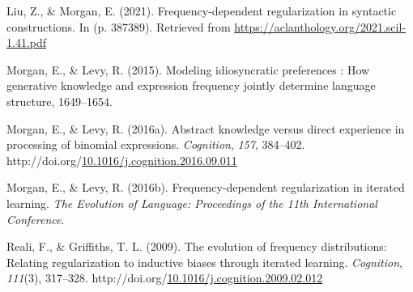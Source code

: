 \documentclass[10pt, letterpaper]{article}
\newenvironment{CSLReferences}%
  {}%
  {\par}
\begin{document}
\begin{CSLReferences}{1}{0}
\leavevmode{}%
Liu, Z., \& Morgan, E. (2021). Frequency-dependent regularization in
syntactic constructions. In (p. 387389). Retrieved from
\url{https://aclanthology.org/2021.scil-1.41.pdf}

\leavevmode{}%
Morgan, E., \& Levy, R. (2015). Modeling idiosyncratic preferences : How
generative knowledge and expression frequency jointly determine language
structure, 1649--1654.

\leavevmode{}%
Morgan, E., \& Levy, R. (2016a). Abstract knowledge versus direct
experience in processing of binomial expressions. \emph{Cognition},
\emph{157}, 384--402.
http://doi.org/\href{https://doi.org/10.1016/j.cognition.2016.09.011}{10.1016/j.cognition.2016.09.011}

\leavevmode{}%
Morgan, E., \& Levy, R. (2016b). Frequency-dependent regularization in
iterated learning. \emph{The Evolution of Language: Proceedings of the
11th International Conference}.

\leavevmode{}%
Reali, F., \& Griffiths, T. L. (2009). The evolution of frequency
distributions: Relating regularization to inductive biases through
iterated learning. \emph{Cognition}, \emph{111}(3), 317--328.
http://doi.org/\href{https://doi.org/10.1016/j.cognition.2009.02.012}{10.1016/j.cognition.2009.02.012}

\end{CSLReferences}


\end{document}
